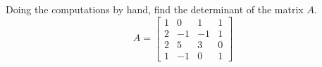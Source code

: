 Doing the computations by hand, find the determinant of the matrix $A$. 
%
\begin{equation*}
A= 
\begin{bmatrix}
1 & 0 & 1 & 1\\
2 & -1 & -1 & 1\\
2 & 5 & 3 & 0\\
1 & -1 & 0 & 1
\end{bmatrix}
\end{equation*}